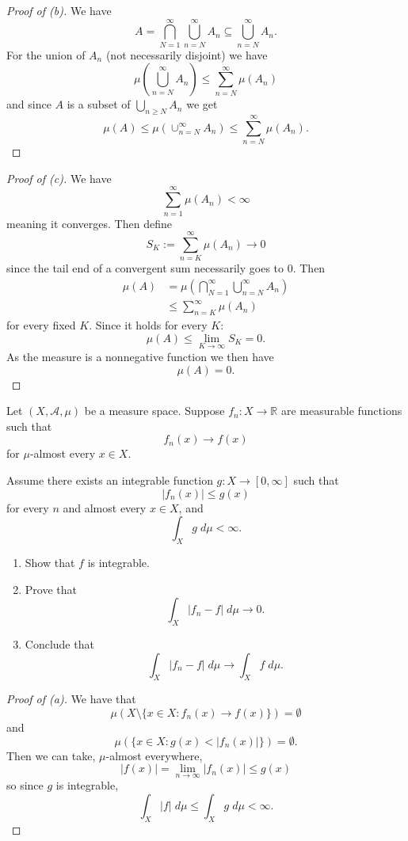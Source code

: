 \begin{proof}[Proof of (b)]
    We have 
    \[
        A = \bigcap_{N=1}^\infty \bigcup_{n=N}^\infty 
        A_n \subseteq 
        \bigcup_{n=N}^\infty A_n.
    \]
    For the union of $A_n$ (not necessarily disjoint) we have 
    \[
        \mu\left(\bigcup_{n=N}^\infty A_n\right)
        \leq \sum_{n=N}^\infty \mu(A_n)
    \]
    and since $A$ is a subset of $\bigcup_{n\geq N} A_n$ we 
    get 
    \[
        \mu(A) \leq 
        \mu\left(\cup_{n=N}^\infty A_n\right) 
        \leq \sum_{n=N}^\infty \mu(A_n).
    \]
\end{proof}
\begin{proof}[Proof of (c)]
    We have 
    \[
        \sum_{n=1}^\infty \mu(A_n) < \infty
    \]
    meaning it converges. Then 
    define 
    \[
        S_K := \sum_{n=K}^\infty \mu(A_n) \to 0 
    \]
    since the tail end of a convergent sum necessarily goes to 
    $0$. Then 
    \begin{align*} 
        \mu(A) 
        &= 
        \mu\left(\bigcap_{N=1}^\infty \bigcup_{n=N}^\infty A_n\right)
        \\ 
        &\leq  
        \sum_{n=K}^\infty \mu(A_n)
    \end{align*}
    for every fixed $K$.
    Since it holds for every $K$: 
    \[
        \mu(A) \leq \lim_{K\to\infty} S_K = 0. 
    \]
    As the measure is a nonnegative function we then have 
    \[
        \mu(A) = 0.
    \]
    
\end{proof}
\newpage 

\begin{prob}
    Let $(X, \mathcal A, \mu)$ be a measure space. 
    Suppose $f_n: X \to \mathbb R$ are measurable functions 
    such that 
    \[
        f_n(x) \to f(x)
    \]
    for $\mu$-almost every $x \in X$.

    Assume there exists an integrable function $g : X \to [0, 
    \infty]$ such that 
    \[
        |f_n(x)| \leq g(x)
    \]
    for every $n$ and almost every $x \in X$, and 
    \[
        \int_X g \; d\mu < \infty. 
    \]
    \begin{enumerate}[label=\alph*)]
        \item Show that $f$ is integrable. 
        \item Prove that 
            \[
                \int_X |f_n - f| \; d\mu \to 0. 
            \]
        \item Conclude that 
            \[
                \int_X |f_n - f| \; d\mu \to 
                \int_X f \; d\mu.
            \]
    \end{enumerate}
\end{prob}
\begin{proof}[Proof of (a)]
    We have that 
    \[
        \mu(X \setminus \{x \in X : f_n(x) \to f(x)\}) 
        = \emptyset
    \]
    and 
    \[
        \mu(\{x \in X : g(x) < |f_n(x)|\}) = \emptyset.
    \]
    Then we can take, $\mu$-almost everywhere, 
    \[
        |f(x)| = \lim_{n\to\infty} |f_n(x)| \leq g(x)
    \]
    so since $g$ is integrable, 
    \[
        \int_X |f| \; d\mu \leq \int_X g \; d\mu < \infty.
    \]
\end{proof}

